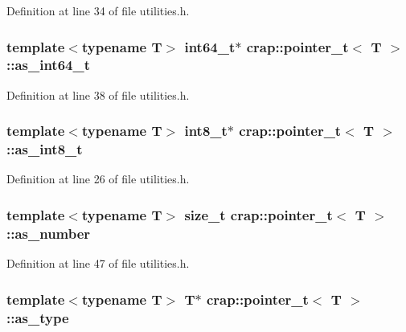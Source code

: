 Definition at line 34 of file utilities.\+h.

\hypertarget{structcrap_1_1pointer__t_a6755b7dbb833df711003a1b6e3188916}{
\subsubsection[{as\+\_\+int64\+\_\+t}]{\setlength{\rightskip}{0pt plus 5cm}template$<$typename T$>$ int64\+\_\+t$\ast$ {\bf crap\+::pointer\+\_\+t}$<$ T $>$\+::as\+\_\+int64\+\_\+t}}\label{structcrap_1_1pointer__t_a6755b7dbb833df711003a1b6e3188916}


Definition at line 38 of file utilities.\+h.

\hypertarget{structcrap_1_1pointer__t_a00a337da13cb56f4f649c524af7606b1}{
\subsubsection[{as\+\_\+int8\+\_\+t}]{\setlength{\rightskip}{0pt plus 5cm}template$<$typename T$>$ int8\+\_\+t$\ast$ {\bf crap\+::pointer\+\_\+t}$<$ T $>$\+::as\+\_\+int8\+\_\+t}}\label{structcrap_1_1pointer__t_a00a337da13cb56f4f649c524af7606b1}


Definition at line 26 of file utilities.\+h.

\hypertarget{structcrap_1_1pointer__t_ae1469dc75976e619e2b330e7be44a2fa}{
\subsubsection[{as\+\_\+number}]{\setlength{\rightskip}{0pt plus 5cm}template$<$typename T$>$ size\+\_\+t {\bf crap\+::pointer\+\_\+t}$<$ T $>$\+::as\+\_\+number}}\label{structcrap_1_1pointer__t_ae1469dc75976e619e2b330e7be44a2fa}


Definition at line 47 of file utilities.\+h.

\hypertarget{structcrap_1_1pointer__t_a345d4e69dd07c3dcaacbb462f3d67745}{
\subsubsection[{as\+\_\+type}]{\setlength{\rightskip}{0pt plus 5cm}template$<$typename T$>$ T$\ast$ {\bf crap\+::pointer\+\_\+t}$<$ T $>$\+::as\+\_\+type}}\label{structcrap_1_1pointer__t_a345d4e69dd07c3dcaacbb462f3d67745}


